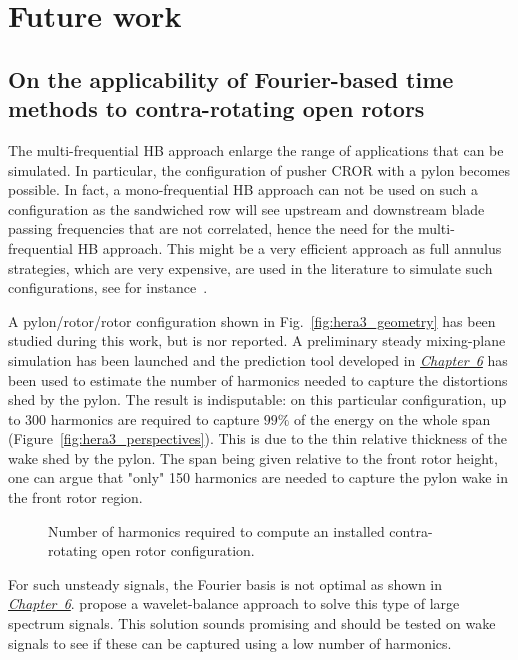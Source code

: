 \section*{Future work}

\subsection*{On the applicability of Fourier-based time methods to contra-rotating open rotors}

The multi-frequential HB approach enlarge the range
of applications that can be simulated. In particular, 
the configuration of pusher CROR with a pylon becomes possible.
In fact, a mono-frequential HB approach can not be
used on such a configuration as the sandwiched row will see upstream
and downstream
blade passing frequencies that are not correlated, hence
the need for the multi-frequential HB approach.
This might be a very efficient approach as full annulus
strategies, which are very expensive, 
are used in the literature to simulate such
configurations, see for instance~\citet{Stuermer2008}.

A pylon/rotor/rotor configuration shown in Fig.~\ref{fig:hera3_geometry}
has been studied during this work, but is nor reported.
A preliminary steady mixing-plane simulation has been
launched and the prediction tool developed in
\hyperref[cha:limitations_convergence]{\emph{Chapter~6}}
has been used to estimate the number
of harmonics needed to capture the distortions shed by the pylon.
The result is indisputable: on this particular configuration,
up to 300 harmonics are required to capture $99\%$ of the energy
on the whole span (Figure~\ref{fig:hera3_perspectives}). 
This is due to the thin relative thickness of the
wake shed by the pylon.
The span being given relative to the front
rotor height, one can argue that "only" 150 harmonics are
needed to capture the pylon wake in the front rotor region.
\begin{figure}[htp]
  \centering
  \caption{Number of harmonics required to compute an 
  installed contra-rotating open rotor configuration.}
\end{figure}

For such unsteady signals, the Fourier basis
is not optimal as shown in 
\hyperref[cha:limitations_convergence]{\emph{Chapter~6}}.
\citet{Li2002} propose a wavelet-balance approach to
solve this type of large spectrum signals. This
solution sounds promising and should be tested on
wake signals to see if these can be captured
using a low number of harmonics.

